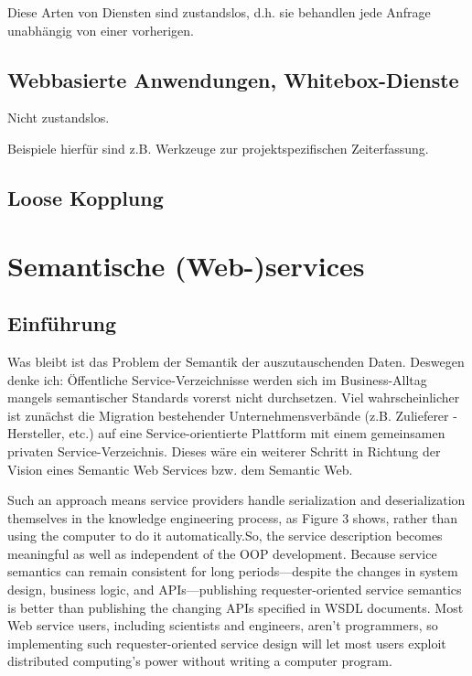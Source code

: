 \documentclass[10pt,a4paper]{article}
\begin{document}
Diese Arten von Diensten sind zustandslos, d.h. sie behandlen jede Anfrage unabhängig von einer vorherigen.
\subsection{Webbasierte Anwendungen, Whitebox-Dienste}
\label{l:webanw}
Nicht zustandslos.

Beispiele hierfür sind z.B. Werkzeuge zur projektspezifischen Zeiterfassung. 
\subsection{Loose Kopplung}
\label{l:loosec}

\section{Semantische (Web-)services}
\label{l:sem-web-ser}
\subsection{Einführung}

Was bleibt ist das Problem der Semantik der auszutauschenden Daten. Deswegen denke ich: Öffentliche Service-Verzeichnisse werden sich im Business-Alltag mangels semantischer Standards vorerst nicht durchsetzen. Viel wahrscheinlicher ist zunächst die Migration bestehender Unternehmensverbände (z.B. Zulieferer - Hersteller, etc.) auf eine Service-orientierte Plattform mit einem gemeinsamen privaten Service-Verzeichnis. Dieses wäre ein weiterer Schritt in Richtung der Vision eines Semantic Web Services bzw. dem Semantic Web.  \cite{hhxmlwssoa} 

Such an approach means service providers handle serialization
and deserialization themselves in the knowledge
engineering process, as Figure 3 shows, rather than using
the computer to do it automatically.So, the service description
becomes meaningful as well as independent of the
OOP development.
Because service semantics can remain consistent for long
periods—despite the changes in system design, business
logic, and APIs—publishing requester-oriented service
semantics is better than publishing the changing APIs specified
in WSDL documents. Most Web service users, including
scientists and engineers, aren’t programmers, so
implementing such requester-oriented service design will
let most users exploit distributed computing’s power without
writing a computer program. \cite{shi1}
\end{document}
